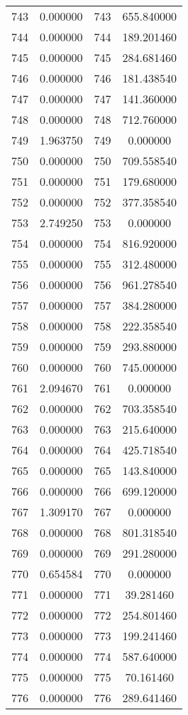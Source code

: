 \documentclass[12pt]{article}
\begin{document}
\begin{longtable}{@{}cccc@{}}
743 & 0.000000 & 743 & 655.840000 \\
744 & 0.000000 & 744 & 189.201460 \\
745 & 0.000000 & 745 & 284.681460 \\
746 & 0.000000 & 746 & 181.438540 \\
747 & 0.000000 & 747 & 141.360000 \\
748 & 0.000000 & 748 & 712.760000 \\
749 & 1.963750 & 749 & 0.000000 \\
750 & 0.000000 & 750 & 709.558540 \\
751 & 0.000000 & 751 & 179.680000 \\
752 & 0.000000 & 752 & 377.358540 \\
753 & 2.749250 & 753 & 0.000000 \\
754 & 0.000000 & 754 & 816.920000 \\
755 & 0.000000 & 755 & 312.480000 \\
756 & 0.000000 & 756 & 961.278540 \\
757 & 0.000000 & 757 & 384.280000 \\
758 & 0.000000 & 758 & 222.358540 \\
759 & 0.000000 & 759 & 293.880000 \\
760 & 0.000000 & 760 & 745.000000 \\
761 & 2.094670 & 761 & 0.000000 \\
762 & 0.000000 & 762 & 703.358540 \\
763 & 0.000000 & 763 & 215.640000 \\
764 & 0.000000 & 764 & 425.718540 \\
765 & 0.000000 & 765 & 143.840000 \\
766 & 0.000000 & 766 & 699.120000 \\
767 & 1.309170 & 767 & 0.000000 \\
768 & 0.000000 & 768 & 801.318540 \\
769 & 0.000000 & 769 & 291.280000 \\
770 & 0.654584 & 770 & 0.000000 \\
771 & 0.000000 & 771 & 39.281460 \\
772 & 0.000000 & 772 & 254.801460 \\
773 & 0.000000 & 773 & 199.241460 \\
774 & 0.000000 & 774 & 587.640000 \\
775 & 0.000000 & 775 & 70.161460 \\
776 & 0.000000 & 776 & 289.641460 \\

\end{longtable}
\end{document}
